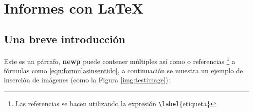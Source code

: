 %
%

\section{Informes con \LaTeX}

	\subsection{Una breve introducción}
	
		\lipsum[4]
		
		
		Este es un párrafo, \textbf{newp} puede contener múltiples  así como  o referencias \footnote{ Las referencias se hacen utilizando la expresión \texttt{\textbackslash label}\{etiqueta\}} a fórmulas como \eqref{eqn:formulasinsentido}, a continuación se muestra un ejemplo de inserción de imágenes (como la Figura \ref{img:testimage}):
		
